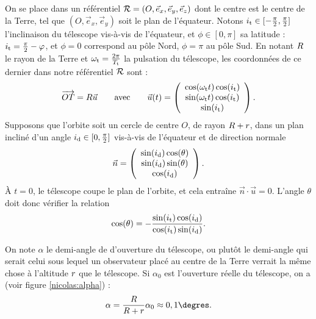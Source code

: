 On se place dans un référentiel $\mathcal{R} = (O,\vec{e}_x,\vec{e}_y,\vec{e}_z)$ dont le centre est le centre de la Terre, tel que $(O,\vec{e}_x,\vec{e}_y)$ soit le plan de l'équateur. Notons $i_\text{t} \in [-\frac{\pi}{2}, \frac{\pi}{2}]$ l'inclinaison du télescope vis-à-vis de l'équateur, et $\phi \in [0,\pi]$ sa latitude : $i_\text{t} = \frac{\pi}{2} - \varphi$, et $\phi=0$ correspond au pôle Nord, $\phi = \pi$ au pôle Sud. En notant  $R$ le rayon de la Terre et $\omega_\text{t} = \frac{2\pi}{T_\text{t}}$ la pulsation du télescope, les coordonnées de ce dernier dans notre référentiel $\mathcal{R}$  sont :
\[ 
\overrightarrow{OT} = R \vec{u} \qquad \text{avec} \qquad \vec{u}(t) = \left(\begin{array}{c}
\cos(\omega_\text{t} t) \cos(i_\text{t}) \\
\sin(\omega_\text{t} t) \cos(i_\text{t}) \\
\sin(i_\text{t})
\end{array}
\right).
\]
Supposons que l'orbite soit un cercle de centre $O$, de rayon $R+r$, dans un plan incliné d'un angle $i_\text{d} \in [0, \frac{\pi}{2}]$ vis-à-vis de l'équateur et de direction normale
\[ 
\vec{n} =  \left(\begin{array}{c}
 \sin(i_\text{d})\cos(\theta) \\
\sin(i_\text{d})\sin(\theta) \\
 \cos(i_\text{d}) 
\end{array}
\right).
\]
À $t=0$, le télescope coupe le plan de l'orbite, et cela entraîne $\vec{n}\cdot \vec{u} = 0$. L'angle $\theta$ doit donc vérifier la relation
\[ \cos(\theta) = - \frac{\sin(i_\text{t})\cos(i_\text{d})}{\cos(i_\text{t})\sin(i_\text{d})}.\]

On note $\alpha$ le demi-angle de d'ouverture du télescope, ou plutôt le demi-angle qui serait celui sous lequel un observateur placé au centre de la Terre verrait la même chose à l'altitude $r$ que le télescope. Si $\alpha_0$ est l'ouverture réelle du télescope, on a (voir figure \ref{nicolas:alpha}) :
\[ \alpha = \frac{\rayonT}{\rayonD} \alpha_0 \approx 0,1\text{\degres}.\]

